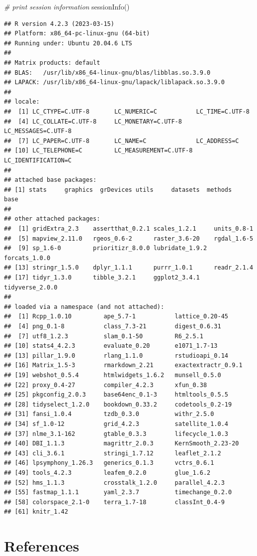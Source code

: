 \documentclass[
  12pt,
]{book}
\newenvironment{Shaded}{\begin{snugshade}}{\end{snugshade}}
\newcommand{\CommentTok}[1]{\textcolor[rgb]{0.56,0.35,0.01}{\textit{#1}}}
\newcommand{\FunctionTok}[1]{\textcolor[rgb]{0.00,0.00,0.00}{#1}}
\newcommand{\NormalTok}[1]{#1}
\begin{document}
\begin{Shaded}
\begin{Highlighting}[]
\CommentTok{\# print session information}
\FunctionTok{sessionInfo}\NormalTok{()}
\end{Highlighting}
\end{Shaded}

\begin{verbatim}
## R version 4.2.3 (2023-03-15)
## Platform: x86_64-pc-linux-gnu (64-bit)
## Running under: Ubuntu 20.04.6 LTS
## 
## Matrix products: default
## BLAS:   /usr/lib/x86_64-linux-gnu/blas/libblas.so.3.9.0
## LAPACK: /usr/lib/x86_64-linux-gnu/lapack/liblapack.so.3.9.0
## 
## locale:
##  [1] LC_CTYPE=C.UTF-8       LC_NUMERIC=C           LC_TIME=C.UTF-8       
##  [4] LC_COLLATE=C.UTF-8     LC_MONETARY=C.UTF-8    LC_MESSAGES=C.UTF-8   
##  [7] LC_PAPER=C.UTF-8       LC_NAME=C              LC_ADDRESS=C          
## [10] LC_TELEPHONE=C         LC_MEASUREMENT=C.UTF-8 LC_IDENTIFICATION=C   
## 
## attached base packages:
## [1] stats     graphics  grDevices utils     datasets  methods   base     
## 
## other attached packages:
##  [1] gridExtra_2.3    assertthat_0.2.1 scales_1.2.1     units_0.8-1     
##  [5] mapview_2.11.0   rgeos_0.6-2      raster_3.6-20    rgdal_1.6-5     
##  [9] sp_1.6-0         prioritizr_8.0.0 lubridate_1.9.2  forcats_1.0.0   
## [13] stringr_1.5.0    dplyr_1.1.1      purrr_1.0.1      readr_2.1.4     
## [17] tidyr_1.3.0      tibble_3.2.1     ggplot2_3.4.1    tidyverse_2.0.0 
## 
## loaded via a namespace (and not attached):
##  [1] Rcpp_1.0.10         ape_5.7-1           lattice_0.20-45    
##  [4] png_0.1-8           class_7.3-21        digest_0.6.31      
##  [7] utf8_1.2.3          slam_0.1-50         R6_2.5.1           
## [10] stats4_4.2.3        evaluate_0.20       e1071_1.7-13       
## [13] pillar_1.9.0        rlang_1.1.0         rstudioapi_0.14    
## [16] Matrix_1.5-3        rmarkdown_2.21      exactextractr_0.9.1
## [19] webshot_0.5.4       htmlwidgets_1.6.2   munsell_0.5.0      
## [22] proxy_0.4-27        compiler_4.2.3      xfun_0.38          
## [25] pkgconfig_2.0.3     base64enc_0.1-3     htmltools_0.5.5    
## [28] tidyselect_1.2.0    bookdown_0.33.2     codetools_0.2-19   
## [31] fansi_1.0.4         tzdb_0.3.0          withr_2.5.0        
## [34] sf_1.0-12           grid_4.2.3          satellite_1.0.4    
## [37] nlme_3.1-162        gtable_0.3.3        lifecycle_1.0.3    
## [40] DBI_1.1.3           magrittr_2.0.3      KernSmooth_2.23-20 
## [43] cli_3.6.1           stringi_1.7.12      leaflet_2.1.2      
## [46] lpsymphony_1.26.3   generics_0.1.3      vctrs_0.6.1        
## [49] tools_4.2.3         leafem_0.2.0        glue_1.6.2         
## [52] hms_1.1.3           crosstalk_1.2.0     parallel_4.2.3     
## [55] fastmap_1.1.1       yaml_2.3.7          timechange_0.2.0   
## [58] colorspace_2.1-0    terra_1.7-18        classInt_0.4-9     
## [61] knitr_1.42
\end{verbatim}

\hypertarget{references}{%
\chapter{References}\label{references}}

  
\end{document}
